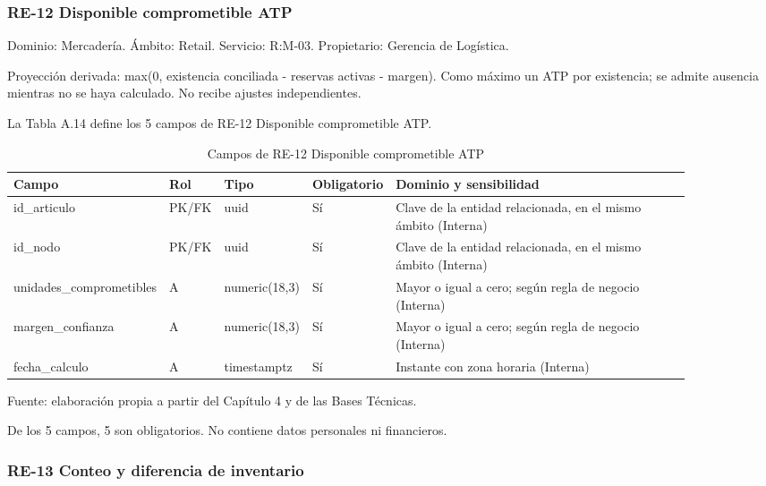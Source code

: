 \documentclass[11pt]{article}
\begin{document}
\subsubsection{RE-12 Disponible comprometible ATP}

Dominio: Mercadería. Ámbito: Retail. Servicio: R:M-03. Propietario: Gerencia de Logística.

Proyección derivada: max(0, existencia conciliada - reservas activas - margen). Como máximo un ATP por existencia; se admite ausencia mientras no se haya calculado. No recibe ajustes independientes.

La Tabla A.14 define los 5 campos de RE-12 Disponible comprometible ATP.

\clearpage

\begin{table}[htbp]
\caption{Campos de RE-12 Disponible comprometible ATP}\label{tab:d_re12}
\centering
\begin{tabular}{@{}p{0.167\linewidth}p{0.070\linewidth}p{0.079\linewidth}p{0.097\linewidth}p{0.465\linewidth}@{}}
\toprule Campo & Rol & Tipo & Obligatorio & Dominio y sensibilidad \\
\midrule
id\_articulo & PK/FK & uuid & Sí & Clave de la entidad relacionada, en el mismo ámbito (Interna) \\
id\_nodo & PK/FK & uuid & Sí & Clave de la entidad relacionada, en el mismo ámbito (Interna) \\
unidades\_comprometibles & A & numeric(18,3) & Sí & Mayor o igual a cero; según regla de negocio (Interna) \\
margen\_confianza & A & numeric(18,3) & Sí & Mayor o igual a cero; según regla de negocio (Interna) \\
fecha\_calculo & A & timestamptz & Sí & Instante con zona horaria (Interna) \\
\bottomrule
\end{tabular}
\par\smallskip
{\raggedright Fuente: elaboración propia a partir del Capítulo 4 y de las Bases Técnicas.\par}
\end{table}


De los 5 campos, 5 son obligatorios. No contiene datos personales ni financieros.

\subsubsection{RE-13 Conteo y diferencia de inventario}
\end{document}
